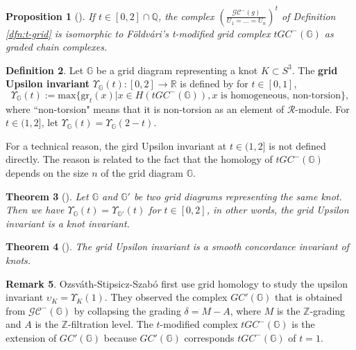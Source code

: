 \documentclass[12pt]{amsart}
\theoremstyle{plain}
\newtheorem{thm}{Theorem}[section]
\theoremstyle{definition}
\newtheorem{dfn}[thm]{Definition}
\newtheorem{rem}[thm]{Remark}
\theoremstyle{plain}
\newtheorem{prop}[thm]{Proposition}
\theoremstyle{definition}
\newcommand{\R}{\mathbb{R}}
\newcommand{\Z}{\mathbb{Z}}
\newcommand{\G}{\mathbb{G}}
\numberwithin{equation}{section}
\begin{document}
\begin{prop}[{\cite[Proposition 4.3]{Concordance-invariant-Upsilon-for-balanced-spatial-graphs-using-grid-homology}}]
\label{U=t}
If $t\in[0,2]\cap\mathbb{Q}$, the complex $\left(\frac{\mathcal{GC}^-(g)}{U_1=\dots=U_n}\right)^t$ of Definition \ref{dfn:t-grid} is isomorphic to F\"{o}ldv\'{a}ri's t-modified grid complex $tGC^-(\G)$ as graded chain complexes.
\end{prop}

\begin{dfn}
Let $\G$ be a grid diagram representing a knot $K\subset S^3$.
The \textbf{grid Upsilon invariant} $\Upsilon_\G(t)\colon[0,2]\to\R$ is defined by for $t\in[0,1]$,
\[
\Upsilon_\G(t):=\mathrm{max}\{\mathrm{gr}_t(x)|x\in H(tGC^{-}(\G)),x\textrm{ is homogeneous, non-torsion}\},
\]
where “non-torsion" means that it is non-torsion as an element of $\mathcal{R}$-module.
For $t\in(1,2]$, let $\Upsilon_\G(t)=\Upsilon_\G(2-t)$.
\end{dfn}

For a technical reason, the gird Upsilon invariant at $t\in(1,2]$ is not defined directly.
The reason is related to the fact that the homology of $tGC^-(\G)$ depends on the size $n$ of the grid diagram $\G$.

\begin{thm}[{\cite[Corollary 5.3]{The-knot-invariant-Upsilon-using-grid-homologies}}]
Let $\G$ and $\G'$ be two grid diagrams representing the same knot.
Then we have $\Upsilon_\G(t)=\Upsilon_{\G'}(t)$ for $t\in[0,2]$, in other words, the grid Upsilon invariant is a knot invariant.
\end{thm}



\begin{thm}[{\cite[Theorem 1.3]{Concordance-invariant-Upsilon-for-balanced-spatial-graphs-using-grid-homology}}]
The grid Upsilon invariant is a smooth concordance invariant of knots.
\end{thm}

\begin{rem}
Ozsv\'{a}th-Stipsicz-Szab\'{o} \cite{Unoriented-knot-Floer-homology-and-the-unoriented-four-ball-genus} first use grid homology to study the upsilon invariant $\upsilon_K=\Upsilon_K(1)$.
They observed the complex $GC'(\G)$ that is obtained from $\mathcal{GC}^-(\G)$ by collapsing the grading $\delta=M-A$, where $M$ is the $\Z$-grading and $A$ is the $\Z$-filtration level.
The $t$-modified complex $tGC^-(\G)$ is the extension of $GC'(\G)$ because $GC'(\G)$ corresponds $tGC^-(\G)$ of $t=1$.
\end{rem}
\end{document}

